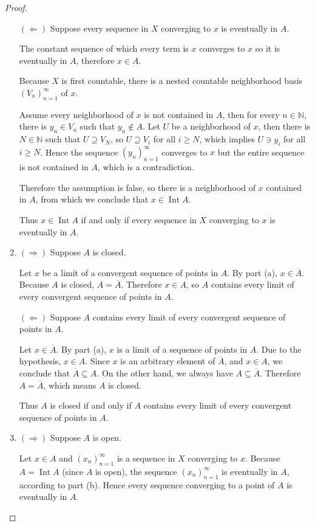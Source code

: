 \begin{proof}
\begin{enumerate}[label={(\alph*)}]
		      $(\Longleftarrow)$ Suppose every sequence in $X$ converging to $x$ is eventually in $A$.

		      The constant sequence of which every term is $x$ converges to $x$ so it is eventually in $A$, therefore $x\in A$.

		      Because $X$ is first countable, there is a nested countable neighborhood basis ${(V_{n})}^{\infty}_{n=1}$ of $x$.

		      Assume every neighborhood of $x$ is not contained in $A$, then for every $n\in\mathbb{N}$, there is $y_{n}\in V_{n}$ such that $y_{n}\notin A$. Let $U$ be a neighborhood of $x$, then there is $N\in\mathbb{N}$ such that $U\supseteq V_{N}$, so $U\supseteq V_{i}$ for all $i\geq N$, which implies $U\ni y_{i}$ for all $i\geq N$. Hence the sequence ${(y_{n})}^{\infty}_{n=1}$ converges to $x$ but the entire sequence is not contained in $A$, which is a contradiction.

		      Therefore the assumption is false, so there is a neighborhood of $x$ contained in $A$, from which we conclude that $x\in\operatorname{Int}A$.

		      Thus $x\in\operatorname{Int}A$ if and only if every sequence in $X$ converging to $x$ is eventually in $A$.
		\item $(\Longrightarrow)$ Suppose $A$ is closed.

		      Let $x$ be a limit of a convergent sequence of points in $A$. By part (a), $x\in \overline{A}$. Because $A$ is closed, $A = \overline{A}$. Therefore $x\in A$, so $A$ contains every limit of every convergent sequence of points in $A$.

		      $(\Longleftarrow)$ Suppose $A$ contains every limit of every convergent sequence of points in $A$.

		      Let $x\in\overline{A}$. By part (a), $x$ is a limit of a sequence of points in $A$. Due to the hypothesis, $x\in A$. Since $x$ is an arbitrary element of $\overline{A}$, and $x\in A$, we conclude that $\overline{A}\subseteq A$. On the other hand, we always have $A\subseteq \overline{A}$. Therefore $A = \overline{A}$, which means $A$ is closed.

		      Thus $A$ is closed if and only if $A$ contains every limit of every convergent sequence of points in $A$.
		\item $(\Longrightarrow)$ Suppose $A$ is open.

		      Let $x\in A$ and ${(x_{n})}^{\infty}_{n=1}$ is a sequence in $X$ converging to $x$. Because $A = \operatorname{Int} A$ (since $A$ is open), the sequence ${(x_{n})}^{\infty}_{n=1}$ is eventually in $A$, according to part (b). Hence every sequence converging to a point of $A$ is eventually in $A$.


\end{enumerate}
\end{proof}
